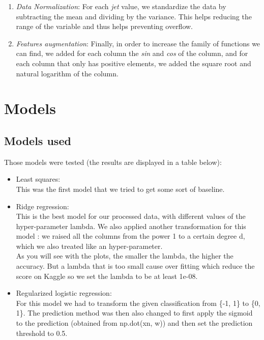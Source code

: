\documentclass[a4paper]{article}
\begin{document}
\begin{multicols*}{2}
\begin{enumerate}
\item \textit{Data Normalization}: For each \textit{jet} value, we standardize the data by subtracting the mean and dividing by the variance. This helps reducing the range of the variable and thus helps preventing overflow.

\item \textit{Features augmentation}: Finally, in order to increase the family of functions we can find, we added for each column the \textit{sin} and \textit{cos} of the column, and for each column that only has positive elements, we added the square root and natural logarithm of the column.
\end{enumerate}

\section{Models}
\subsection{Models used}
Those models were tested (the results are displayed in a table below):

\begin{itemize}
\item Least squares:\\
\hspace*{3mm}This was the first model that we tried to get some sort of baseline.
\item Ridge regression:\\
\hspace*{3mm}This is the best model for our processed data, with different values of the hyper-parameter lambda. We also applied another transformation for this model : we raised all the columns from the power 1 to a certain degree d, which we also treated like an hyper-parameter. \\As you will see with the plots, the smaller the lambda, the higher the accuracy. But a lambda that is too small cause over fitting which reduce the score on Kaggle so we set the lambda to be at least 1e-08. 
\item Regularized logistic regression:\\
\hspace*{3mm}For this model we had to transform the given classification from \{-1, 1\} to \{0, 1\}. The prediction method was then also changed to first apply the sigmoid to the prediction (obtained from np.dot(xn, w)) and then set the prediction threshold to 0.5. 
\end{itemize}


\end{multicols*}
\end{document}
